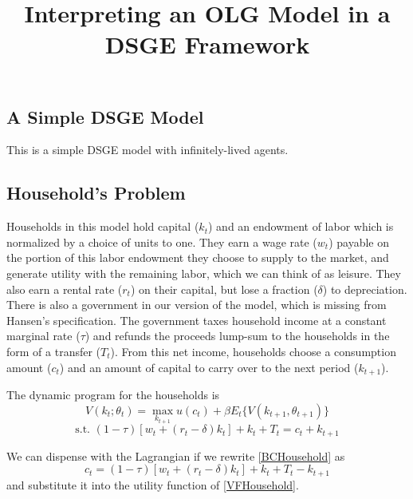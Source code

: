 \documentclass[letterpaper,12pt]{article}
\theoremstyle{definition}
\begin{document}
\begin{titlepage}
	\title{Interpreting an OLG Model in a DSGE Framework}
\end{titlepage}

\begin{spacing}{1.5}

\section{A Simple DSGE Model}\label{Linear_LogLinApprox}
	This is a simple DSGE model with infinitely-lived agents.

	\subsection{Household's Problem}
		Households in this model hold capital ($k_t$) and an endowment of labor which is normalized by a choice of units to one. They earn a wage rate ($w_t$) payable on the portion of this labor endowment they choose to supply to the market, and generate utility with the remaining labor, which we can think of as leisure. They also earn a rental rate ($r_t$) on their capital, but lose a fraction ($\delta$) to depreciation. There is also a government in our version of the model, which is missing from Hansen's specification. The government taxes household income at a constant marginal rate ($\tau$) and refunds the proceeds lump-sum to the households in the form of a transfer ($T_t$). From this net income, households choose a consumption amount ($c_t$) and an amount of capital to carry over to the next period ($k_{t+1}$).

		The dynamic program for the households is
		\begin{equation}\label{VFHousehold}
		 V(k_t;\theta_t) = \max_{k_{t+1}} u(c_t) + \beta E_t\{V(k_{t+1},\theta_{t+1})\}
		\end{equation}
		\begin{equation}\label{BCHousehold}
		\text{s.t. } (1-\tau) \left[w_t+(r_t-\delta)k_t\right] + k_t + T_t = c_t+k_{t+1}
		\end{equation}

		We can dispense with the Lagrangian if we rewrite \eqref{BCHousehold} as
		\begin{equation}\label{ConsDef}
		c_t = (1-\tau) \left[w_t+(r_t-\delta)k_t\right] + k_t + T_t-k_{t+1}
		\end{equation}
		and substitute it into the utility function of \eqref{VFHousehold}.


\end{spacing}
\end{document}
